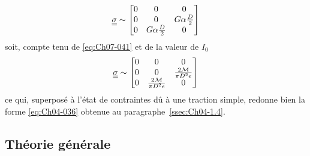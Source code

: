 \begin{displaymath}
    \underline{\underline{\sigma}} \sim
    \begin{bmatrix}
        0 & 0 & 0 \\
        0 & 0 & G \alpha \frac{D}{2} \\
        0 & G\alpha \frac{D}{2} & 0
    \end{bmatrix}
\end{displaymath}
soit, compte tenu de \eqref{eq:Ch07-041} et de la valeur de $I_0$
\begin{equation}
    \underline{\underline{\sigma}} \sim
    \begin{bmatrix}
        0 & 0 & 0 \\
        0 & 0 & \frac{2\mathcal{M}}{\pi D^2 e} \\
        0 & \frac{2\mathcal{M}}{\pi D^2 e} & 0
    \end{bmatrix}
    \label{eq:Ch07-047}
\end{equation}
ce qui, superposé à l'état de contraintes dû à une traction simple, redonne bien la forme \eqref{eq:Ch04-036} obtenue au paragraphe~\ref{ssec:Ch04-1.4}.
\subsection{Théorie générale}
\endinput
Nous considérons maintenant le problème 4 dans le cas d'une section 
quelConque. Le § 1 a montré que la contrainte normale ~ était déterminée
. 
~~ 
par 'R~ , 'lll~, <ro..~. Puisqu'ici ils sont nuls, on prendra donc ~~ = O. Les contraintes de cisaillement 0::.:. et cr~; par contre ne peuvent pas être nulles d'après \eqref{eq:Ch07-007}. Nous cherchons donc un champ de contraintes sous la forme 
ocr;:. <ro~,]
\eqref{eq:Ch06-048} <li 
Sl.. 0
= [
<r~) 0 0 
avec 

fonctions de (x ,x2,x). Les équations d'équilibre donnent
l 3
'd 0.;1, ô 0:.,
\eqref{eq:Ch06-049} 0
+ '" 
Cl -:1:" Ô 'X.~ 

()c:;~ 0
'" ""> (J~!j, = ()''ù ( :C" l'Xl) 
à 'X.,
\eqref{eq:Ch06-050} r 
l â 0:;; 
0 
â 'X, 

= 0::., = ~; ('X.:., 'X!) 
L'équation \eqref{eq:Ch06-049} montre alors -voir par exemple le Lemme 2 du § 111.3.1 -que la forme différentielle 
\eqref{eq:Ch06-051} 

est intégrable, càd il existe une "fonction des contraintes" P(OC.tJ6:!) telle 
que 
ô<Ïl '6p
\eqref{eq:Ch06-052} ,
<ï.;~ '" ~ô = 
ô ((.~ o-x.:, 

Les équations de Beltrami donnent alors 
d ô
\eqref{eq:Ch06-053} j~ 0
~ 
j~ '" 
Ô/.C.I, Ô -X~ 

